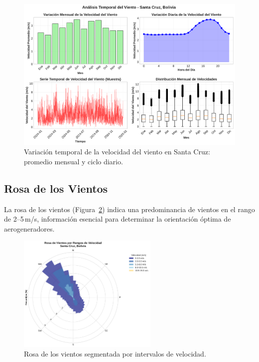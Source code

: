 \documentclass[a4paper,12pt]{article}
\begin{document}
	\begin{figure}[H]
		\centering
		\includegraphics[width=1.0\textwidth]{variacion_temporal.pdf}
		\caption{Variación temporal de la velocidad del viento en Santa Cruz: promedio mensual y ciclo diario.}
		\label{fig:mensual}
		\label{fig:diurno}
	\end{figure}
	
	\subsection{Rosa de los Vientos}
	La rosa de los vientos (Figura~\ref{fig:rosa}) indica una predominancia de vientos en el rango de 2–5\,m/s, información esencial para determinar la orientación óptima de aerogeneradores.
	
	\begin{figure}[H]
		\centering
		\includegraphics[width=0.6\textwidth]{rosa_vientos_colorizada.pdf}
		\caption{Rosa de los vientos segmentada por intervalos de velocidad.}
		\label{fig:rosa}
	\end{figure}
	
\end{document}
